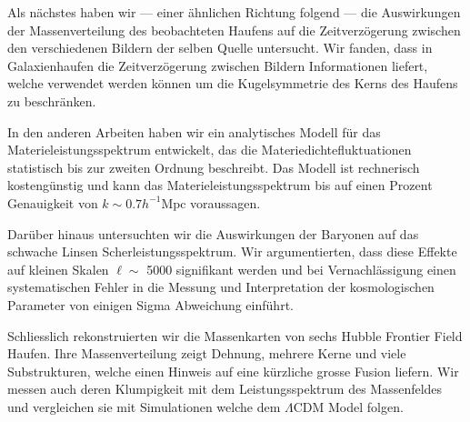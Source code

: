 Als n\"achstes haben wir --- einer {\"a}hnlichen Richtung folgend --- die
Auswirkungen der Massenverteilung des beobachteten Haufens auf die
Zeitverz\"ogerung zwischen den verschiedenen Bildern der selben Quelle untersucht.
Wir fanden, dass in Galaxienhaufen die Zeitverz{\"o}gerung zwischen Bildern
Informationen liefert, welche verwendet werden k{\"o}nnen um die Kugelsymmetrie
des Kerns des Haufens zu beschr{\"a}nken.

In den anderen Arbeiten haben wir ein analytisches Modell f{\"u}r das
Materieleistungsspektrum entwickelt, das die Materiedichtefluktuationen
statistisch bis zur zweiten Ordnung beschreibt.
Das Modell ist  rechnerisch kosteng{\"u}nstig und kann das
Materieleistungsspektrum bis auf einen Prozent Genauigkeit von
$k \sim 0.7 h^{- 1} \mathrm{Mpc}$ voraussagen.

Dar{\"u}ber hinaus untersuchten wir die Auswirkungen der Baryonen auf das
schwache Linsen Scherleistungsspektrum. Wir argumentierten, dass diese Effekte
auf kleinen Skalen $\ell \sim$ 5000 signifikant werden und bei
Vernachl{\"a}ssigung einen systematischen Fehler in die Messung und
Interpretation der kosmologischen Parameter von einigen Sigma Abweichung
einf{\"u}hrt.

Schliesslich rekonstruierten wir die Massenkarten von sechs Hubble
Frontier Field Haufen. Ihre Massenverteilung zeigt Dehnung, mehrere Kerne und
viele Substrukturen, welche einen Hinweis auf eine k\"urzliche grosse Fusion
liefern. Wir messen auch deren Klumpigkeit mit dem
Leistungsspektrum des Massenfeldes und vergleichen sie mit Simulationen welche
dem $\Lambda$CDM Model folgen.

